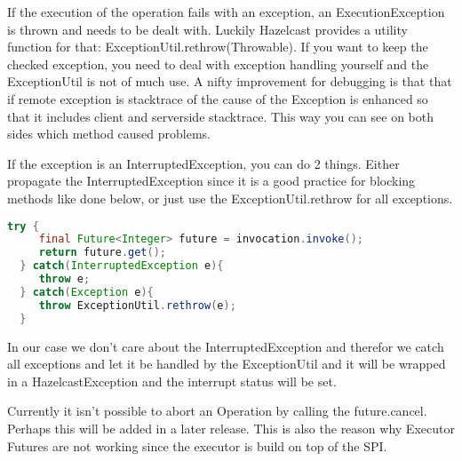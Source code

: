 If the execution of the operation fails with an exception, an ExecutionException is thrown and needs to be dealt with. Luckily Hazelcast provides a utility function for that: ExceptionUtil.rethrow(Throwable). If you want to keep the checked exception, you need to deal with exception handling yourself and the ExceptionUtil  is not of much use. 
A nifty improvement for debugging is that that if remote exception is  stacktrace of the cause of the Exception is enhanced so that it includes client and serverside stacktrace. This way you can see on both sides which method caused problems.

If the exception is an InterruptedException, you can do 2 things. Either propagate the InterruptedException since it is a good practice for blocking methods like done below, or just use the ExceptionUtil.rethrow for all exceptions. 
\begin{lstlisting}[language=java]
  try {
     final Future<Integer> future = invocation.invoke();
     return future.get();
  } catch(InterruptedException e){
     throw e;
  } catch(Exception e){
     throw ExceptionUtil.rethrow(e);
  }
\end{lstlisting}
In our case we don't care about the InterruptedException and therefor we catch all exceptions and let it be handled by the ExceptionUtil and it will be wrapped in a HazelcastException and the interrupt status will be set.

Currently it isn't possible to abort an Operation by calling the future.cancel. Perhaps this will be added in a later release. This is also the reason why Executor Futures are not working since the executor is build on top of the SPI.

